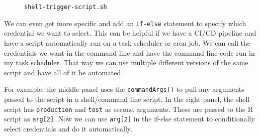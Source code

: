 \documentclass[
  letterpaper,
  DIV=11,
  numbers=noendperiod,
  oneside]{scrartcl}
\newenvironment{Shaded}{\begin{snugshade}}{\end{snugshade}}
\newcommand{\AttributeTok}[1]{\textcolor[rgb]{0.40,0.45,0.13}{#1}}
\newcommand{\CommentTok}[1]{\textcolor[rgb]{0.37,0.37,0.37}{#1}}
\newcommand{\ExtensionTok}[1]{\textcolor[rgb]{0.00,0.23,0.31}{#1}}
\newcommand{\NormalTok}[1]{\textcolor[rgb]{0.00,0.23,0.31}{#1}}
\newcommand{\StringTok}[1]{\textcolor[rgb]{0.13,0.47,0.30}{#1}}
\begin{document}
\begin{figure}
\begin{codelisting}
\end{codelisting}

\begin{codelisting}

\caption{\texttt{shell-trigger-script.sh}}

\begin{Shaded}
\end{Shaded}

\end{codelisting}

\end{figure}%

\newpage{}

We can even get more specific and add an \texttt{if-else} statement to
specify which credential we want to select. This can be helpful if we
have a CI/CD pipeline and have a script automatically run on a task
scheduler or cron job. We can call the credentials we want in the
command line and have the command line code run in my task scheduler.
That way we can use multiple different versions of the same script and
have all of it be automated.

For example, the middle panel uses the \texttt{commandArgs()} to pull
any arguments passed to the script in a shell/command line script. In
the right panel, the shell script has \texttt{production} and
\texttt{test} as second arguments. These are passed to the R script as
\texttt{arg{[}2{]}}. Now we can use \texttt{arg{[}2{]}} in the if-else
statement to conditionally select credentials and do it automatically.
\end{document}
